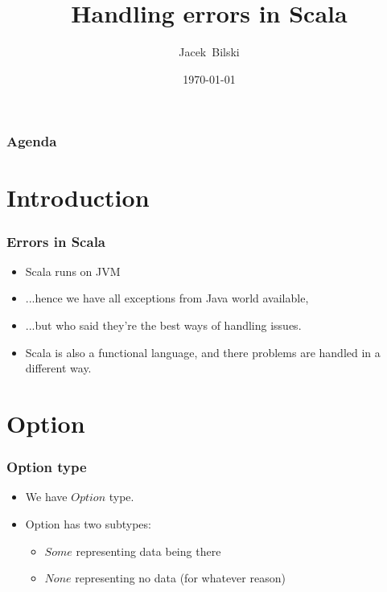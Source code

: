 \documentclass[xcolor=dvipsnames]{beamer}
\title{Handling errors in Scala}
\author{Jacek~Bilski}
\date{\today}
\begin{document}
\begin{frame}
\titlepage
\end{frame}

\begin{frame}
\frametitle{Agenda}
\tableofcontents[pausesections]
\end{frame}



\section{Introduction}

\begin{frame}
\frametitle{Errors in Scala}
\begin{itemize}
\item Scala runs on JVM
\item ...hence we have all exceptions from Java world available,
\item ...but who said they're the best ways of handling issues.
\item Scala is also a functional language, and there problems are handled in a different way.
\end{itemize}
\end{frame}

\section{Option}



\begin{frame}
\frametitle{Option type}
\begin{itemize}
\item We have $Option$ type.
\item Option has two subtypes:
    \begin{itemize}
    \item $Some$ representing data being there
    \item $None$ representing no data (for whatever reason)
    \end{itemize}
\end{itemize}
\end{frame}
\end{document}
